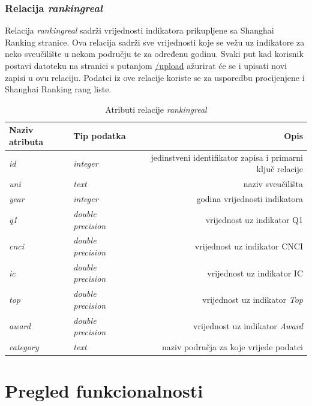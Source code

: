\documentclass[times, utf8, zavrsni]{fer}
\begin{document}
           \newpage \subsection{Relacija \emph{rankingreal}}   
           Relacija \emph{rankingreal} sadrži vrijednosti indikatora prikupljene sa Shanghai Ranking stranice. Ova relacija sadrži sve 
           vrijednosti koje se vežu uz indikatore za neko sveučilište u nekom području te za određenu godinu. Svaki put kad korisnik 
           postavi datoteku na stranici s putanjom \url{/upload} ažurirat će se i upisati novi zapisi u ovu relaciju. Podatci iz ove 
           relacije koriste se za usporedbu procijenjene i Shanghai Ranking rang liste.
           \begin{table}[htb]
            \caption{Atributi relacije \emph{rankingreal}}
                \label{tbl:rankingreal}
                \centering
                \begin{tabular}{llr} \hline
                Naziv atributa & Tip podatka & Opis\\ \hline
                \emph{id} &  \emph{integer} & jedinstveni identifikator zapisa i primarni ključ relacije\\
                \emph{uni} &  \emph{text} & naziv sveučilišta\\
                \emph{year} &  \emph{integer} & godina vrijednosti indikatora\\
                \emph{q1} &  \emph{double precision} & vrijednost uz indikator Q1\\
                \emph{cnci} &  \emph{double precision} & vrijednost uz indikator CNCI\\
                \emph{ic} &  \emph{double precision} & vrijednost uz indikator IC\\
                \emph{top} &  \emph{double precision} & vrijednost uz indikator \emph{Top}\\
                \emph{award} &  \emph{double precision} & vrijednost uz indikator \emph{Award}\\
                \emph{category} &  \emph{text} & naziv područja za koje vrijede podatci\\
                \end{tabular}
                \end{table}
                \FloatBarrier 
\chapter{Pregled funkcionalnosti}
\end{document}

